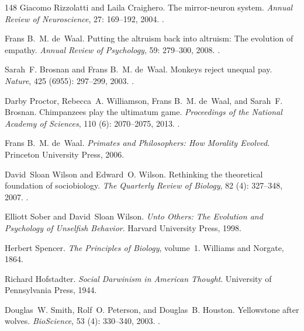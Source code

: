 \documentclass[11pt]{article}
\theoremstyle{plain}
\theoremstyle{definition}
\theoremstyle{remark}
\begin{document}
\begin{thebibliography}{148}
Giacomo Rizzolatti and Laila Craighero.
\newblock The mirror-neuron system.
\newblock \emph{Annual Review of Neuroscience}, 27: 169--192, 2004.
\newblock {}.

Frans B.~M. de~Waal.
\newblock Putting the altruism back into altruism: The evolution of empathy.
\newblock \emph{Annual Review of Psychology}, 59: 279--300, 2008.
\newblock {}.

Sarah~F. Brosnan and Frans B.~M. de~Waal.
\newblock Monkeys reject unequal pay.
\newblock \emph{Nature}, 425 (6955): 297--299, 2003.
\newblock {}.

Darby Proctor, Rebecca~A. Williamson, Frans B.~M. de~Waal, and Sarah~F.
  Brosnan.
\newblock Chimpanzees play the ultimatum game.
\newblock \emph{Proceedings of the National Academy of Sciences}, 110
  (6): 2070--2075, 2013.
\newblock {}.

Frans B.~M. de~Waal.
\newblock \emph{Primates and Philosophers: How Morality Evolved}.
\newblock Princeton University Press, 2006.

David~Sloan Wilson and Edward~O. Wilson.
\newblock Rethinking the theoretical foundation of sociobiology.
\newblock \emph{The Quarterly Review of Biology}, 82 (4):
  327--348, 2007.
\newblock {}.

Elliott Sober and David~Sloan Wilson.
\newblock \emph{Unto Others: The Evolution and Psychology of Unselfish
  Behavior}.
\newblock Harvard University Press, 1998.

Herbert Spencer.
\newblock \emph{The Principles of Biology}, volume~1.
\newblock Williams and Norgate, 1864.

Richard Hofstadter.
\newblock \emph{Social {Darwinism} in {American} Thought}.
\newblock University of Pennsylvania Press, 1944.

Douglas~W. Smith, Rolf~O. Peterson, and Douglas~B. Houston.
\newblock Yellowstone after wolves.
\newblock \emph{BioScience}, 53 (4): 330--340, 2003.
\newblock {}.


\end{thebibliography}
\end{document}
